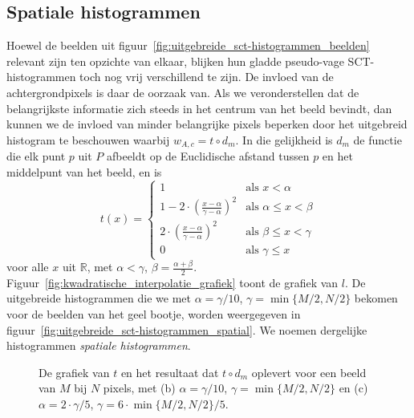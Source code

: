 \subsection{Spatiale histogrammen}

Hoewel de beelden uit figuur~\ref{fig:uitgebreide_sct-histogrammen_beelden} relevant zijn ten
opzichte van elkaar, blijken hun gladde pseudo-vage SCT-histogrammen toch nog vrij verschillend 
te zijn. De invloed van de achtergrondpixels is daar de oorzaak van. Als we veronderstellen dat
de belangrijkste informatie zich steeds in het centrum van het beeld bevindt, dan kunnen we
de invloed van minder belangrijke pixels beperken door het uitgebreid histogram te beschouwen waarbij
$w_{A,c}=t \circ d_m$. In die gelijkheid is $d_m$ de functie die elk punt $p$ uit $P$ afbeeldt 
op de Euclidische afstand tussen $p$ en het middelpunt van het beeld, en is
$$
t(x) = \left\{ \begin{array}{ll}
1 & \textrm{als } x < \alpha \\
1 - 2 \cdot \left( \frac{x-\alpha}{\gamma - \alpha} \right)^2 & \textrm{als } \alpha \le x < \beta \\[6pt]
2 \cdot \left( \frac{x-\alpha}{\gamma - \alpha} \right)^2 & \textrm{als } \beta \le x < \gamma \\
0 & \textrm{als } \gamma \le x
\end{array} \right.
$$
voor alle $x$ uit $\mathbb{R}$, met $\alpha < \gamma$, $\beta=\frac{\alpha + \beta}{2}$. 
Figuur~\ref{fig:kwadratische_interpolatie_grafiek} toont de grafiek van $l$. De uitgebreide
histogrammen die we met $\alpha=\gamma / 10$, $\gamma = \min\{M/2, N/2\}$ bekomen voor de beelden 
van het geel bootje, worden weergegeven in
figuur~\ref{fig:uitgebreide_sct-histogrammen_spatial}. We noemen dergelijke histogrammen
\emph{spatiale histogrammen}.

\begin{figure}[tbp]
\begin{center}
\caption{\label{fig:kwadratische_interpolatie}De grafiek van $t$ en het resultaat dat
$t \circ d_m$ oplevert voor een beeld van $M$ bij $N$ pixels, met
(b) $\alpha=\gamma / 10$, $\gamma = \min\{M/2, N/2\}$ en 
(c) $\alpha=2 \cdot \gamma / 5$, $\gamma = 6 \cdot \min\{M/2, N/2\} / 5$.}
\end{center}
\end{figure}


